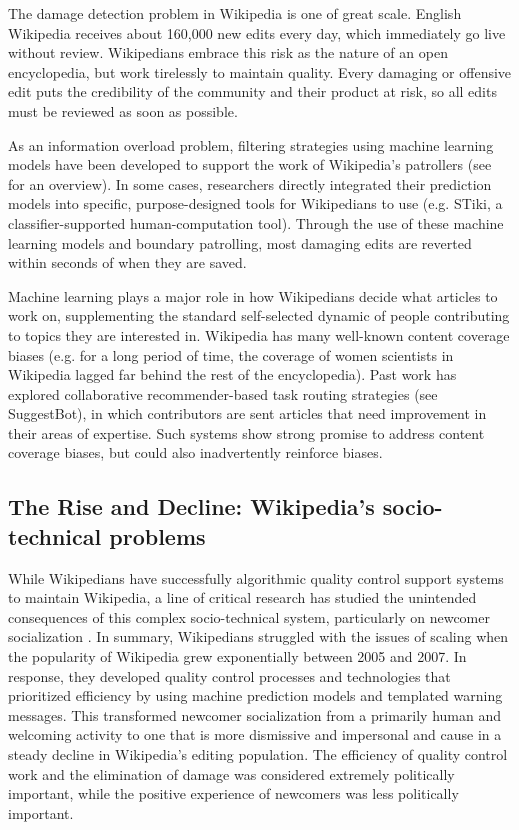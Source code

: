  The damage detection problem in Wikipedia is one of great scale.  English Wikipedia receives about 160,000 new edits every day, which immediately go live without review.  Wikipedians embrace this risk as the nature of an open encyclopedia, but work tirelessly to maintain quality. Every damaging or offensive edit puts the credibility of the community and their product at risk, so all edits must be reviewed as soon as possible\cite{geiger2010work}.

As an information overload problem, filtering strategies using machine learning models have been developed to support the work of Wikipedia's patrollers (see \cite{adler2011wikipedia} for an overview).  In some cases, researchers directly integrated their prediction models into specific, purpose-designed tools for Wikipedians to use (e.g. STiki\cite{west2010stiki}, a classifier-supported human-computation tool). Through the use of these machine learning models and boundary patrolling, most damaging edits are reverted within seconds of when they are saved\cite{geiger2013levee}.

Machine learning plays a major role in how Wikipedians decide what articles to work on, supplementing the standard self-selected dynamic of people contributing to topics they are interested in. Wikipedia has many well-known content coverage biases (e.g. for a long period of time, the coverage of women scientists in Wikipedia lagged far behind the rest of the encyclopedia\cite{halfaker2017interpolating}). Past work has explored collaborative recommender-based task routing strategies (see SuggestBot\cite{cosley2007suggestbot}), in which contributors are sent articles that need improvement in their areas of expertise. Such systems show strong promise to address content coverage biases, but could also inadvertently reinforce biases.

\subsection{The Rise and Decline: Wikipedia's socio-technical problems}
While Wikipedians have successfully algorithmic quality control support systems to maintain Wikipedia, a line of critical research has studied the unintended consequences of this complex socio-technical system, particularly on newcomer socialization \cite{halfaker2013rise,morgan2013tea,halfaker2014snuggle}.  In summary, Wikipedians struggled with the issues of scaling when the popularity of Wikipedia grew exponentially between 2005 and 2007\cite{halfaker2013rise}.  In response, they developed quality control processes and technologies that prioritized efficiency by using machine prediction models\cite{halfaker2014snuggle} and templated warning messages\cite{halfaker2013rise}.  This transformed newcomer socialization from a primarily human and welcoming activity to one that is more dismissive and impersonal\cite{morgan2013tea} and cause in a steady decline in Wikipedia's editing population.  The efficiency of quality control work and the elimination of damage was considered extremely politically important, while the positive experience of newcomers was less politically important.

